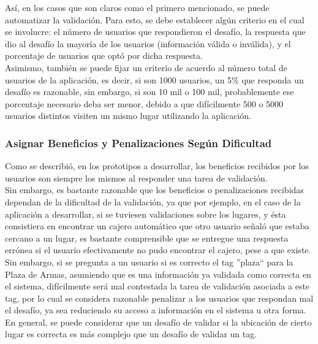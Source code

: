 \documentclass[10pt,letterpaper]{article}
\begin{document}
Así, en los casos que son claros como el primero mencionado, se puede automatizar la validación. Para esto, se debe establecer algún criterio en el cual se involucre: el número de usuarios que respondieron el desafío, la respuesta que dio al desafío la mayoría de los usuarios (información válida o inválida), y el porcentaje de usuarios que optó por dicha respuesta.\\

Asimismo, también se puede fijar un criterio de acuerdo al número total de usuarios de la aplicación, es decir, si son 1000 usuarios, un 5\% que responda un desafío es razonable, sin embargo, si son 10 mil o 100 mil, probablemente ese porcentaje necesario deba ser menor, debido a que difícilmente 500 o 5000 usuarios distintos visiten un mismo lugar utilizando la aplicación.\\

\subsubsection{Asignar Beneficios y Penalizaciones Según Dificultad}

Como se describió, en los prototipos a desarrollar, los beneficios recibidos por los usuarios son siempre los mismos al responder una tarea de validación.\\

Sin embargo, es bastante razonable que los beneficios o penalizaciones recibidas dependan de la dificultad de la validación, ya que por ejemplo, en el caso de la aplicación a desarrollar, si se tuviesen validaciones sobre los lugares, y ésta consistiera en encontrar un cajero automático que otro usuario señaló que estaba cercano a un lugar, es bastante comprensible que se entregue una respuesta errónea si el usuario efectivamente no pudo encontrar el cajero, pese a que existe. Sin embargo, si se pregunta a un usuario si es correcto el tag ''plaza`` para la Plaza de Armas, asumiendo que es una información ya validada como correcta en el sistema, difícilmente será mal contestada la tarea de validación asociada a este tag, por lo cual se considera razonable penalizar a los usuarios que respondan mal el desafío, ya sea reduciendo su acceso a información en el sistema u otra forma.\\

En general, se puede considerar que un desafío de validar si la ubicación de cierto lugar es correcta es más complejo que un desafío de validar un tag.\\
\end{document}
